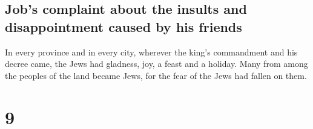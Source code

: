 \hypertarget{jobs-complaint-about-the-insults-and-disappointment-caused-by-his-friends}{%
\subsection{Job's complaint about the insults and disappointment caused
by his
friends}\label{jobs-complaint-about-the-insults-and-disappointment-caused-by-his-friends}}

 In every province and in every city, wherever the king's
commandment and his decree came, the Jews had gladness, joy, a feast and
a holiday. Many from among the peoples of the land became Jews, for the
fear of the Jews had fallen on them.

\hypertarget{section-8}{%
\section{9}\label{section-8}}

